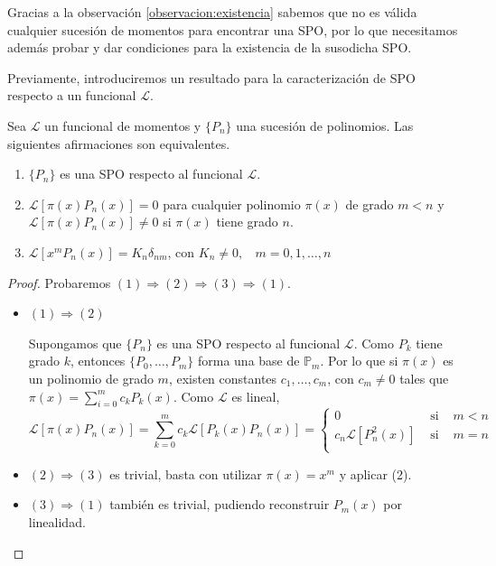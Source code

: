 Gracias a la observación \ref{observacion:existencia} sabemos que no es válida cualquier sucesión de momentos para encontrar una SPO, por lo que necesitamos además probar y dar condiciones para la existencia de la susodicha SPO. 

Previamente, introduciremos un resultado para la caracterización de SPO respecto a un funcional $\mathcal{L}$.

\begin{teorema}
    \label{th:caracterizacion}
Sea $\mathcal{L}$ un funcional de momentos y $\{P_n\}$ una sucesión de polinomios. Las siguientes afirmaciones son equivalentes.
\begin{enumerate}
    \item $\{P_n\}$ es una SPO respecto al funcional $\mathcal{L}$.
    \item $\mathcal{L}[\pi(x)P_n(x)]=0$ para cualquier polinomio $\pi(x)$ de grado $m<n$ y $\mathcal{L}[\pi(x)P_n(x)]\not=0$ si $\pi(x)$ tiene grado $n$.
    \item $\mathcal{L}[x^m P_n(x)]=K_n \delta_{nm}$, con $K_n\not=0, \ \ \ \ m=0,1,\dots,n$
\end{enumerate}
\end{teorema}
\begin{proof}
    Probaremos $(1)\Rightarrow(2)\Rightarrow(3)\Rightarrow(1)$.

    \begin{itemize}
        \item $(1)\Rightarrow(2)$
        
        Supongamos que $\{P_n\}$ es una SPO respecto al funcional $\mathcal{L}$. Como $P_k$ tiene grado $k$, entonces $\{P_0,\dots,P_m\}$ forma una base de $\mathbb P_m$. Por lo que si $\pi(x)$ es un polinomio de grado $m$, existen constantes $c_1,\dots,c_m$, con $c_m\not=0$ tales que $\pi(x)=\sum_{i=0}^m c_k P_k(x)$. Como $\mathcal{L}$ es lineal,
        $$
        \mathcal{L}[\pi(x)P_n(x)]=\sum_{k=0}^m c_k \mathcal{L}[P_k(x) P_n(x)]=\left\lbrace\begin{array}{ccl}
            0 & \text{ si } & m<n \\
            c_n\mathcal{L}[P_n^2(x)] & \text{ si } & m=n \\             
        \end{array}\right.
        $$
        \item $(2)\Rightarrow(3)$ es trivial, basta con utilizar $\pi(x)=x^m$ y aplicar (2).
        \item $(3)\Rightarrow(1)$ también es trivial, pudiendo reconstruir $P_m(x)$ por linealidad. 
    \end{itemize}
\end{proof}


